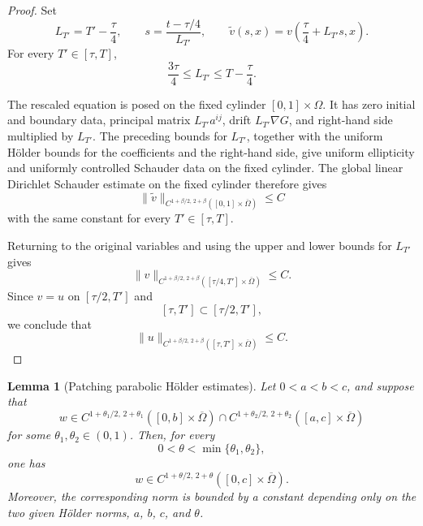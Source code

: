 \documentclass[11pt]{article}
\newtheorem{lemma}[theorem]{Lemma}
\theoremstyle{remark}
\begin{document}
\begin{proof}
Set
\[
L_{T'}=T'-\frac{\tau}{4},
\qquad
s=\frac{t-\tau/4}{L_{T'}},
\qquad
\widetilde{v}(s,x)
=
v\left(\frac{\tau}{4}+L_{T'}s,x\right).
\]
For every $T'\in[\tau,T]$,
\[
\frac{3\tau}{4}
\leq
L_{T'}
\leq
T-\frac{\tau}{4}.
\]

The rescaled equation is posed on the fixed cylinder
$[0,1]\times\Omega$. It has zero initial and boundary data, principal
matrix $L_{T'}a^{ij}$, drift $L_{T'}\nabla G$, and right-hand side
multiplied by $L_{T'}$. The preceding bounds for $L_{T'}$, together with
the uniform H\"older bounds for the coefficients and the right-hand side,
give uniform ellipticity and uniformly controlled Schauder data on the
fixed cylinder. The global linear Dirichlet Schauder estimate on the fixed
cylinder therefore gives
\[
\|\widetilde{v}\|_{C^{1+\beta/2,\,2+\beta}
([0,1]\times\overline{\Omega})}
\leq C
\]
with the same constant for every $T'\in[\tau,T]$.

Returning to the original variables and using the upper and lower bounds
for $L_{T'}$ gives
\[
\|v\|_{C^{1+\beta/2,\,2+\beta}
([\tau/4,T']\times\overline{\Omega})}
\leq C.
\]
Since $v=u$ on $[\tau/2,T']$ and
\[
[\tau,T']\subset[\tau/2,T'],
\]
we conclude that
\[
\|u\|_{C^{1+\beta/2,\,2+\beta}
([\tau,T']\times\overline{\Omega})}
\leq C.
\]
\end{proof}

\begin{lemma}[Patching parabolic H\"older estimates]
\label{lem:holder-patching}
Let $0<a<b<c$, and suppose that
\[
w\in
C^{1+\theta_1/2,\,2+\theta_1}
([0,b]\times\overline{\Omega})
\cap
C^{1+\theta_2/2,\,2+\theta_2}
([a,c]\times\overline{\Omega})
\]
for some $\theta_1,\theta_2\in(0,1)$. Then, for every
\[
0<\theta<\min\{\theta_1,\theta_2\},
\]
one has
\[
w\in
C^{1+\theta/2,\,2+\theta}
([0,c]\times\overline{\Omega}).
\]
Moreover, the corresponding norm is bounded by a constant depending only
on the two given H\"older norms, $a$, $b$, $c$, and $\theta$.
\end{lemma}
\end{document}
